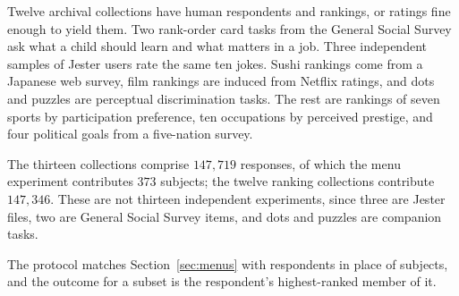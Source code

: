 \documentclass[11pt]{article}
\theoremstyle{italichead}
\begin{document}
Twelve archival collections have human respondents and rankings, or ratings fine enough
to yield them. Two rank-order card tasks from the General Social Survey ask what a
child should learn and what matters in a job. Three independent samples of Jester users
rate the same ten jokes. Sushi rankings come from a Japanese web survey, film rankings
are induced from Netflix ratings, and dots and puzzles are perceptual discrimination
tasks. The rest are rankings of seven sports by participation preference, ten
occupations by perceived prestige, and four political goals from a five-nation survey.

The thirteen collections comprise $147{,}719$ responses, of which the menu experiment
contributes $373$ subjects; the twelve ranking collections contribute $147{,}346$.
These are not thirteen independent experiments, since three are Jester files, two are
General Social Survey items, and dots and puzzles are companion tasks.

The protocol matches Section~\ref{sec:menus} with respondents in place of subjects, and
the outcome for a subset is the respondent's highest-ranked member of it.
\end{document}
